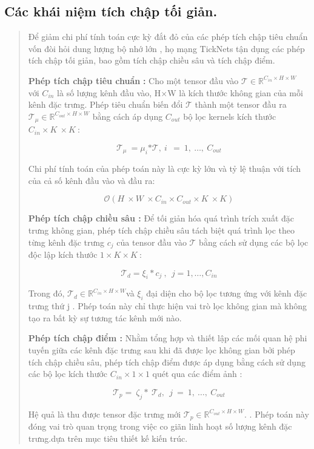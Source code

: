 \documentclass[
  12pt,
  a4paper,
]{report}
\begin{document}
\subsection{Các khái niệm tích chập tối
giản.}\label{cuxe1c-khuxe1i-niux1ec7m-tuxedch-chux1eadp-tux1ed1i-giux1ea3n.}

\begin{quote}
Để giảm chi phí tính toán cực kỳ đắt đỏ của các phép tích chập tiêu
chuẩn vốn đòi hỏi dung lượng bộ nhớ lớn , họ mạng TickNets tận dụng các
phép tích chập tối giản, bao gồm tích chập chiều sâu và tích chập điểm.

\textbf{Phép tích chập tiêu chuẩn} \textbf{:} Cho một tensor đầu vào
\(\mathcal{T \in}\mathbb{R}^{C_{in} \times H \times W}\) với \(C_{in}\)
là số lượng kênh đầu vào, H\(\times\)W là kích thước không gian của mỗi
kênh đặc trưng. Phép tiêu chuẩn biến đổi \(\mathcal{T}\) thành một
tensor đầu ra
\(\mathcal{T}_{\mu} \in \mathbb{R}^{C_{out} \times H \times W}\) bằng
cách áp dụng \(C_{out}\) bộ lọc kernels kích thước
\(C_{in} \times K\  \times K\ :\)

\[\mathcal{T}_{\mu}\  = \mu_{i}\mathcal{*T,\ }i\ \  = \ 1,\ \ldots,\ C_{out}\]

Chi phí tính toán của phép toán này là cực kỳ lớn và tỷ lệ thuận với
tích của cả số kênh đầu vào và đầu ra:

\[\mathcal{O}\left( H\  \times W\  \times C_{in} \times C_{out} \times K\  \times K \right)\]

\textbf{Phép tích chập chiều sâu :} Để tối giản hóa quá trình trích xuất
đặc trưng không gian, phép tích chập chiều sâu tách biệt quá trình lọc
theo từng kênh đặc trưng \(c_{j}\) của tensor đầu vào \(\mathcal{T}\)
bằng cách sử dụng các bộ lọc độc lập kích thước
\(1 \times K \times K\ \):

\[\mathcal{T}_{d} = \xi_{i}*c_{j}\ ,\ \ j = 1,\ldots,C_{in}\]

Trong đó,
\(\mathcal{T}_{d} \in \mathbb{R}^{C_{in} \times H \times W}\)và
\(\xi_{i}\) đại diện cho bộ lọc tương ứng với kênh đặc trưng thứ j .
Phép toán này chỉ thực hiện vai trò lọc không gian mà không tạo ra bất
kỳ sự tương tác kênh mới nào.

\textbf{Phép tích chập điểm :} Nhằm tổng hợp và thiết lập các mối quan
hệ phi tuyến giữa các kênh đặc trưng sau khi đã được lọc không gian bởi
phép tích chập chiều sâu, phép tích chập điểm được áp dụng bằng cách sử
dụng các bộ lọc kích thước \(C_{in} \times 1 \times 1\) quét qua các
điểm ảnh :

\[\mathcal{T}_{p} = \ \zeta_{j}*\ \mathcal{T}_{d},\ \ j\  = \ 1,\ \ldots,\ C_{out}\]

Hệ quả là thu được tensor đặc trưng mới
\(\mathcal{T}_{p} \in \mathbb{R}^{C_{out} \times H \times W}\). . Phép
toán này đóng vai trò quan trọng trong việc co giãn linh hoạt số lượng
kênh đặc trưng.dựa trên mục tiêu thiết kế kiến trúc.
\end{quote}
\end{document}
